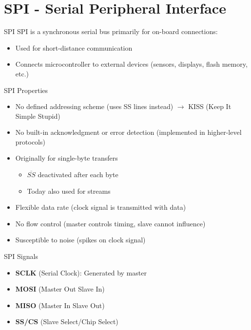 
\section{SPI - Serial Peripheral Interface}


\begin{definition}{SPI}
SPI is a synchronous serial bus primarily for on-board connections:
\begin{itemize}
    \item Used for short-distance communication
    \item Connects microcontroller to external devices (sensors, displays, flash memory, etc.)
\end{itemize}
\end{definition}

\begin{theorem}{SPI Properties}
\begin{itemize}
    \item No defined addressing scheme (uses SS lines instead) $\rightarrow$ KISS (Keep It Simple Stupid)
    \item No built-in acknowledgment or error detection (implemented in higher-level protocols)
    \item Originally for single-byte transfers 
    \begin{itemize}
            \item $\overline{SS}$ deactivated after each byte
            \item Today also used for streams 
    \end{itemize}
    \item Flexible data rate (clock signal is transmitted with data)
    \item No flow control (master controls timing, slave cannot influence)
    \item Susceptible to noise (spikes on clock signal)
\end{itemize}
\end{theorem}

\begin{corollary}{SPI Signals}
\begin{itemize}
    \item \textbf{SCLK} (Serial Clock): Generated by master
    \item \textbf{MOSI} (Master Out Slave In)
    \item \textbf{MISO} (Master In Slave Out)
    \item \textbf{SS/CS} (Slave Select/Chip Select)
\end{itemize}
\end{corollary}

